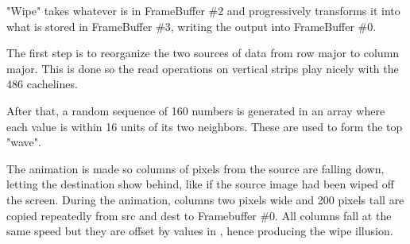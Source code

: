 \par
"Wipe" takes whatever is in FrameBuffer \#2 and progressively transforms it into what is stored in FrameBuffer \#3, writing the output into FrameBuffer \#0.\\%
\par
The first step is to reorganize the two sources of data from row major to column major. This is done so the read operations on vertical strips play nicely with the 486 cachelines.\\
\par
{}
\par
After that, a random sequence of 160 numbers is generated in an array  where each value is within 16 units of its two neighbors. These are used to form the top "wave".\\
\par The animation is made so columns of pixels from the source are falling down, letting the destination show behind, like if the source image had been wiped off the screen. During the animation, columns two pixels wide and 200 pixels tall are copied repeatedly from src and dest to Framebuffer \#0. All columns fall at the same speed but they are offset by values in , hence producing the wipe illusion.




